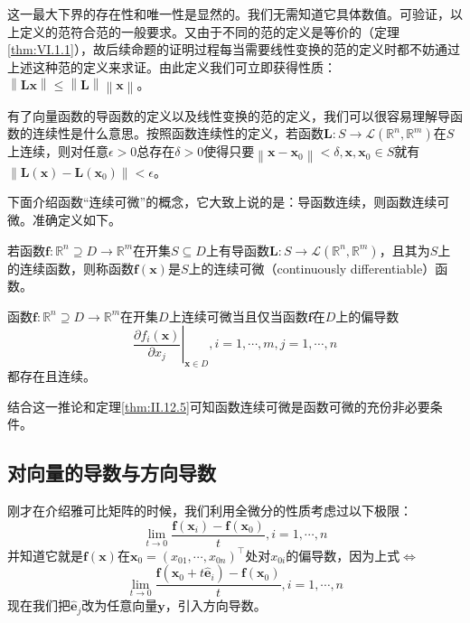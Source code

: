 \documentclass[main.tex]{subfiles}
\begin{document}
这一最大下界的存在性和唯一性是显然的。我们无需知道它具体数值。可验证，以上定义的范符合范的一般要求。又由于不同的范的定义是等价的（定理\ref{thm:VI.1.1}），故后续命题的证明过程每当需要线性变换的范的定义时都不妨通过上述这种范的定义来求证。由此定义我们可立即获得性质：$\left\|\mathbf{Lx}\right\|\leq\left\|\mathbf{L}\right\|\left\|\mathbf{x}\right\|$。

有了向量函数的导函数的定义以及线性变换的范的定义，我们可以很容易理解导函数的连续性是什么意思。按照函数连续性的定义，若函数$\mathbf{L}:S\rightarrow\mathcal{L}\left(\mathbb{R}^n,\mathbb{R}^m\right)$在$S$上连续，则对任意$\epsilon>0$总存在$\delta>0$使得只要$\left\|\mathbf{x}-\mathbf{x}_0\right\|<\delta,\mathbf{x},\mathbf{x}_0\in S$就有$\left\|\mathbf{L}\left(\mathbf{x}\right)-\mathbf{L}\left(\mathbf{x}_0\right)\right\|<\epsilon$。

下面介绍函数“连续可微”的概念，它大致上说的是：导函数连续，则函数连续可微。准确定义如下。

\begin{definition}[连续可微函数]
若函数$\mathbf{f}:\mathbb{R}^n\supseteq D\rightarrow\mathbb{R}^m$在开集$S\subseteq D$上有导函数$\mathbf{L}:S\rightarrow\mathcal{L}\left(\mathbb{R}^n,\mathbb{R}^m\right)$，且其为$S$上的连续函数，则称函数$\mathbf{f}\left(\mathbf{x}\right)$是$S$上的连续可微（continuously differentiable）函数。
\end{definition}

\begin{corollary}
函数$\mathbf{f}:\mathbb{R}^n\supseteq D\rightarrow\mathbb{R}^m$在开集$D$上连续可微当且仅当函数$\mathbf{f}$在$D$上的偏导数
\[
\left.\frac{\partial f_i\left(\mathbf{x}\right)}{\partial x_j}\right|_{\mathbf{x}\in D},i=1,\cdots,m,j=1,\cdots,n
\]
都存在且连续。
\end{corollary}

结合这一推论和定理\ref{thm:II.12.5}可知函数连续可微是函数可微的充份非必要条件。

\subsection{对向量的导数与方向导数}
刚才在介绍雅可比矩阵的时候，我们利用全微分的性质考虑过以下极限：
\[
\lim_{t\to 0}\frac{\mathbf{f}\left(\mathbf{x}_i\right)-\mathbf{f}\left(\mathbf{x}_0\right)}{t},i=1,\cdots,n\]
并知道它就是$\mathbf{f}\left(\mathbf{x}\right)$在$\mathbf{x}_0=\left(x_{01},\cdots,x_{0n}\right)^\intercal$处对$x_{0i}$的偏导数，因为上式$\Leftrightarrow$
\[
\lim_{t\rightarrow 0}\frac{\mathbf{f}\left(\mathbf{x}_0+t\mathbf{\hat{e}}_i\right)-\mathbf{f}\left(\mathbf{x}_0\right)}{t},i=1,\cdots,n
\]
现在我们把$\mathbf{\hat{e}}_j$改为任意向量$\mathbf{y}$，引入方向导数。
\end{document}
